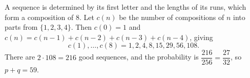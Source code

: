 A sequence is determined by its first letter and the lengths of its runs, which form a composition of $8$. Let $c(n)$ be the number of compositions of $n$ into parts from $\{1,2,3,4\}$. Then $c(0)=1$ and $c(n)=c(n-1)+c(n-2)+c(n-3)+c(n-4)$, giving
\[c(1),\dots,c(8)=1,2,4,8,15,29,56,108.\]
There are $2\cdot108=216$ good sequences, and the probability is $\dfrac{216}{256}=\dfrac{27}{32}$, so $p+q=\boxed{59}$.
